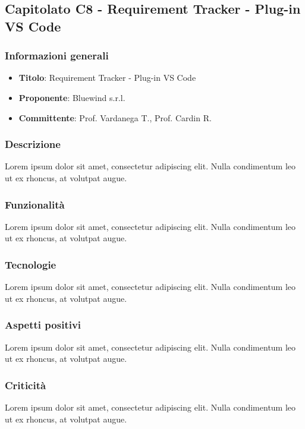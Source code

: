 \subsection{Capitolato C8 - Requirement Tracker - Plug-in VS Code}
     \subsubsection{Informazioni generali}
        \begin{itemize}
            \item \textbf{Titolo}: Requirement Tracker - Plug-in VS Code
            \item \textbf{Proponente}: Bluewind s.r.l.
            \item \textbf{Committente}: Prof. Vardanega T., Prof. Cardin R.
        \end{itemize}
     \subsubsection{Descrizione}
    Lorem ipsum dolor sit amet, consectetur adipiscing elit. Nulla condimentum leo ut ex rhoncus, at volutpat augue.
     \subsubsection{Funzionalità}
    Lorem ipsum dolor sit amet, consectetur adipiscing elit. Nulla condimentum leo ut ex rhoncus, at volutpat augue.
    \subsubsection{Tecnologie}
    Lorem ipsum dolor sit amet, consectetur adipiscing elit. Nulla condimentum leo ut ex rhoncus, at volutpat augue.
    \subsubsection{Aspetti positivi}
    Lorem ipsum dolor sit amet, consectetur adipiscing elit. Nulla condimentum leo ut ex rhoncus, at volutpat augue.
    \subsubsection{Criticità}
    Lorem ipsum dolor sit amet, consectetur adipiscing elit. Nulla condimentum leo ut ex rhoncus, at volutpat augue.